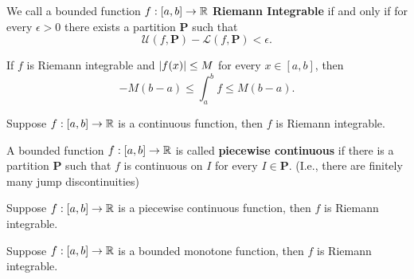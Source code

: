 \documentclass[twoside]{article}
\begin{document}
\begin{definition}
	We call a bounded function $f : [a,b] \to \mathbb{R}$ \textbf{Riemann Integrable} if and only if for every
	$\epsilon > 0$ there exists a partition $\bm{P}$ such that
	\begin{equation*}
		\mathcal{U} (f, \bm{P}) - \mathcal{L}(f, \bm{P}) < \epsilon.
	\end{equation*}
\end{definition}

\begin{theorem}
	If $f$ is Riemann integrable and $\abs{f(x)} \leq M$ for every $x \in [a, b]$, then
	\begin{equation*}
		-M(b-a) \leq \int_{a}^{b} f \leq M(b-a).
	\end{equation*}
\end{theorem}

\begin{theorem}
	Suppose $f : [a,b] \to \mathbb{R}$ is a continuous function, then $f$ is Riemann integrable.
\end{theorem}

\begin{definition}
	A bounded function $f : [a, b] \to \mathbb{R}$ is called \textbf{piecewise continuous} if there is a partition $\bm{P}$
	such that $f$ is continuous on $I$ for every $I \in \bm{P}$. (I.e., there are finitely many jump discontinuities)
\end{definition}

\begin{theorem}
	Suppose $f : [a,b] \to \mathbb{R}$ is a piecewise continuous function, then $f$ is Riemann integrable.
\end{theorem}

\begin{theorem}
	Suppose $f : [a,b] \to \mathbb{R}$ is a bounded monotone function, then $f$ is Riemann integrable.
\end{theorem}
\end{document}
